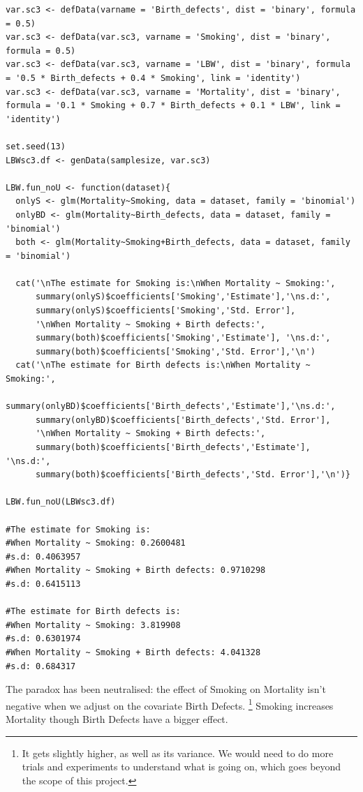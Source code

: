\documentclass{article}
\begin{document}
\begin{lstlisting}
var.sc3 <- defData(varname = 'Birth_defects', dist = 'binary', formula = 0.5)
var.sc3 <- defData(var.sc3, varname = 'Smoking', dist = 'binary', formula = 0.5)
var.sc3 <- defData(var.sc3, varname = 'LBW', dist = 'binary', formula = '0.5 * Birth_defects + 0.4 * Smoking', link = 'identity')
var.sc3 <- defData(var.sc3, varname = 'Mortality', dist = 'binary', formula = '0.1 * Smoking + 0.7 * Birth_defects + 0.1 * LBW', link = 'identity')

set.seed(13)
LBWsc3.df <- genData(samplesize, var.sc3)

LBW.fun_noU <- function(dataset){
  onlyS <- glm(Mortality~Smoking, data = dataset, family = 'binomial')
  onlyBD <- glm(Mortality~Birth_defects, data = dataset, family = 'binomial')
  both <- glm(Mortality~Smoking+Birth_defects, data = dataset, family = 'binomial')
  
  cat('\nThe estimate for Smoking is:\nWhen Mortality ~ Smoking:', 
      summary(onlyS)$coefficients['Smoking','Estimate'],'\ns.d:', 
      summary(onlyS)$coefficients['Smoking','Std. Error'],
      '\nWhen Mortality ~ Smoking + Birth defects:', 
      summary(both)$coefficients['Smoking','Estimate'], '\ns.d:', 
      summary(both)$coefficients['Smoking','Std. Error'],'\n')
  cat('\nThe estimate for Birth defects is:\nWhen Mortality ~ Smoking:', 
      summary(onlyBD)$coefficients['Birth_defects','Estimate'],'\ns.d:', 
      summary(onlyBD)$coefficients['Birth_defects','Std. Error'],
      '\nWhen Mortality ~ Smoking + Birth defects:', 
      summary(both)$coefficients['Birth_defects','Estimate'], '\ns.d:', 
      summary(both)$coefficients['Birth_defects','Std. Error'],'\n')}

LBW.fun_noU(LBWsc3.df)

#The estimate for Smoking is:
#When Mortality ~ Smoking: 0.2600481 
#s.d: 0.4063957 
#When Mortality ~ Smoking + Birth defects: 0.9710298 
#s.d: 0.6415113 

#The estimate for Birth defects is:
#When Mortality ~ Smoking: 3.819908 
#s.d: 0.6301974 
#When Mortality ~ Smoking + Birth defects: 4.041328 
#s.d: 0.684317 
\end{lstlisting}
The paradox has been neutralised: the effect of Smoking on Mortality isn't negative when we adjust on the covariate Birth Defects. \footnote{It gets slightly higher, as well as its variance. We would need to do more trials and experiments to understand what is going on, which goes beyond the scope of this project.} Smoking increases Mortality though Birth Defects have a bigger effect.\par
\newpage
\end{document}
